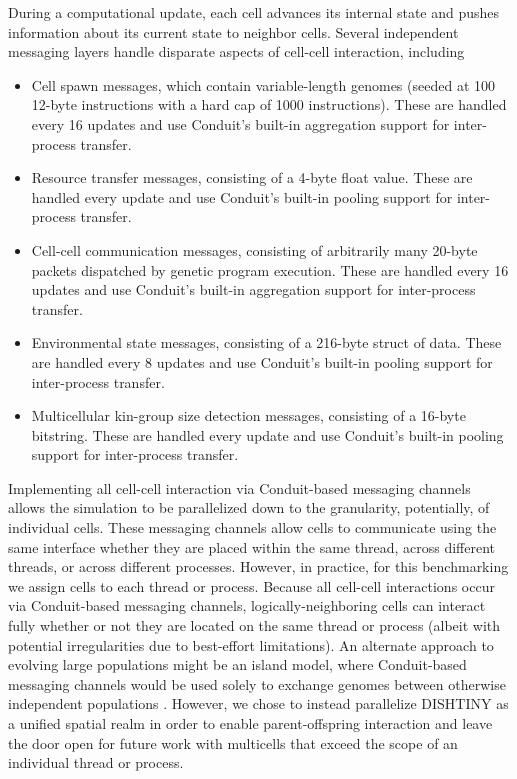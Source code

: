 During a computational update, each cell advances its internal state and pushes information about its current state to neighbor cells.
Several independent messaging layers handle disparate aspects of cell-cell interaction, including
\begin{itemize}
  \item Cell spawn messages, which contain variable-length genomes (seeded at 100 12-byte instructions with a hard cap of 1000 instructions). These are handled every 16 updates and use Conduit's built-in aggregation support for inter-process transfer.
  \item Resource transfer messages, consisting of a 4-byte float value. These are handled every update and use Conduit's built-in pooling support for inter-process transfer.
  \item Cell-cell communication messages, consisting of arbitrarily many 20-byte packets dispatched by genetic program execution. These are handled every 16 updates and use Conduit's built-in aggregation support for inter-process transfer.
  \item Environmental state messages, consisting of a 216-byte struct of data. These are handled every 8 updates and use Conduit's built-in pooling support for inter-process transfer.
  \item Multicellular kin-group size detection messages, consisting of a 16-byte bitstring. These are handled every update and use Conduit's built-in pooling support for inter-process transfer.
\end{itemize}

Implementing all cell-cell interaction via Conduit-based messaging channels allows the simulation to be parallelized down to the granularity, potentially, of individual cells.
These messaging channels allow cells to communicate using the same interface whether they are placed within the same thread, across different threads, or across different processes.
However, in practice, for this benchmarking we assign  cells to each thread or process.
Because all cell-cell interactions occur via Conduit-based messaging channels, logically-neighboring cells can interact fully whether or not they are located on the same thread or process (albeit with potential irregularities due to best-effort limitations).
An alternate approach to evolving large populations might be an island model, where Conduit-based messaging channels would be used solely to exchange genomes between otherwise independent populations \cite{bennett1999building}.
However, we chose to instead parallelize DISHTINY as a unified spatial realm in order to enable parent-offspring interaction and leave the door open for future work with multicells that exceed the scope of an individual thread or process.
